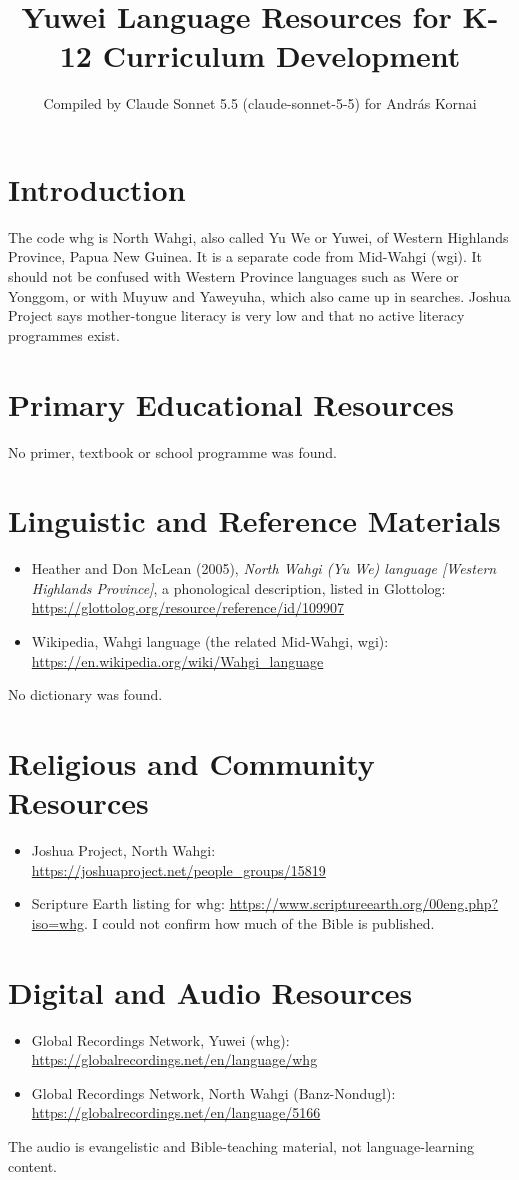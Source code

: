 \documentclass[12pt]{article}
\title{Yuwei Language Resources for K-12 Curriculum Development}
\author{Compiled by Claude Sonnet 5.5 (claude-sonnet-5-5) for Andr\'as Kornai}
\date{}
\begin{document}
\maketitle

\section{Introduction}
The code whg is North Wahgi, also called Yu We or Yuwei, of Western Highlands Province, Papua New Guinea. It is a separate code from Mid-Wahgi (wgi). It should not be confused with Western Province languages such as Were or Yonggom, or with Muyuw and Yaweyuha, which also came up in searches. Joshua Project says mother-tongue literacy is very low and that no active literacy programmes exist.

\section{Primary Educational Resources}
No primer, textbook or school programme was found.

\section{Linguistic and Reference Materials}
\begin{itemize}
\item Heather and Don McLean (2005), \emph{North Wahgi (Yu We) language [Western Highlands Province]}, a phonological description, listed in Glottolog: \url{https://glottolog.org/resource/reference/id/109907}
\item Wikipedia, Wahgi language (the related Mid-Wahgi, wgi): \url{https://en.wikipedia.org/wiki/Wahgi_language}
\end{itemize}
No dictionary was found.

\section{Religious and Community Resources}
\begin{itemize}
\item Joshua Project, North Wahgi: \url{https://joshuaproject.net/people_groups/15819}
\item Scripture Earth listing for whg: \url{https://www.scriptureearth.org/00eng.php?iso=whg}. I could not confirm how much of the Bible is published.
\end{itemize}

\section{Digital and Audio Resources}
\begin{itemize}
\item Global Recordings Network, Yuwei (whg): \url{https://globalrecordings.net/en/language/whg}
\item Global Recordings Network, North Wahgi (Banz-Nondugl): \url{https://globalrecordings.net/en/language/5166}
\end{itemize}
The audio is evangelistic and Bible-teaching material, not language-learning content.
\end{document}
